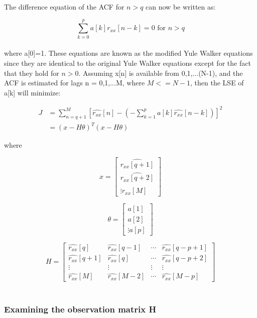 \documentclass{article}
\begin{document}
The difference equation of the ACF for $n>q$ can now be written as:

\begin{equation}
\sum_{k=0}^p {a[k]r_{xx}[n-k]=0} \text{ for } n>q
\end{equation}
\\
where a[0]=1. These equations are known as the modified Yule Walker equations since they are identical to the original Yule Walker equations except for the fact that they hold for $n>0$. Assuming x[n] is available from 0,1,...(N-1), and the ACF is estimated for lags n = 0,1,...M, where $M <= N-1$, then the LSE of a[k] will minimize:

\begin{align}
J &= \sum_{n=q+1}^M {[ \hat{r_{xx}}[n] - ( - \sum_{k=1}^p a[k] \hat{r_{xx}}[n-k])]^2} \\
&= (x - H\theta)^T (x - H\theta)
\end{align}

where

\begin{equation}
x = 
\begin{bmatrix}
\hat{r_{xx}[q+1]}\\
\hat{r_{xx}[q+2]}\\
\vdots
\hat{r_{xx}[M]}
\end{bmatrix}
\end{equation}

\begin{equation}
\theta = 
\begin{bmatrix}
a[1]\\
a[2]\\
\vdots
a[p]
\end{bmatrix}
\end{equation}

\begin{equation}
H = 
\begin{bmatrix}
\hat{r_{xx}}[q] & \hat{r_{xx}}[q-1] & \cdots & \hat{r_{xx}}[q-p+1]\\
\hat{r_{xx}}[q+1] & \hat{r_{xx}}[q] & \cdots & \hat{r_{xx}}[q-p+2]\\
\vdots & \vdots & \vdots & \vdots\\
\hat{r_{xx}}[M] & \hat{r_{xx}}[M-2] & \cdots & \hat{r_{xx}}[M-p]
\end{bmatrix}
\end{equation}
\\

\subsubsection{Examining the observation matrix H}
\vspace{0.5cm}
\end{document}
